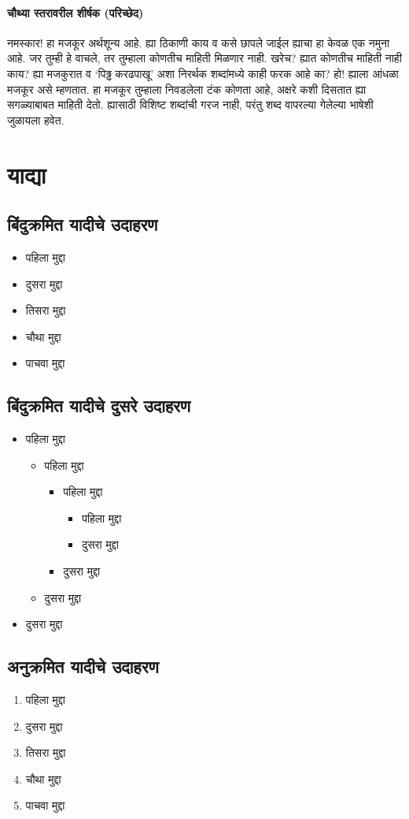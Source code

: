 \paragraph{चौथ्या स्तरावरील शीर्षक (परिच्छेद)}
नमस्कार! हा मजकूर अर्थशून्य आहे. ह्या ठिकाणी काय व कसे छापले जाईल ह्याचा हा केवळ एक नमुना आहे. जर तुम्ही हे वाचले, तर तुम्हाला कोणतीच माहिती मिळणार नाही. खरेच? ह्यात कोणतीच माहिती नाही काय? ह्या मजकुरात व `पिढ्ढ करढपाखू' अशा निरर्थक शब्दांमध्ये काही फरक आहे का? हो! ह्याला आंधळा मजकूर असे म्हणतात. हा मजकूर तुम्हाला निवडलेला टंक कोणता आहे, अक्षरे कशी दिसतात ह्या सगळ्याबाबत माहिती देतो. ह्यासाठी विशिष्ट शब्दांची गरज नाही, परंतु शब्द वापरल्या गेलेल्या भाषेशी जुळायला हवेत.
\section{याद्या}
\subsection{बिंदुक्रमित यादीचे उदाहरण}
\begin{itemize}
\item पहिला मुद्दा
\item दुसरा मुद्दा
\item तिसरा मुद्दा
\item चौथा मुद्दा
\item पाचवा मुद्दा
\end{itemize}
\subsection*{बिंदुक्रमित यादीचे दुसरे उदाहरण}
\begin{itemize}
\item पहिला मुद्दा
\begin{itemize}
\item पहिला मुद्दा
\begin{itemize}
\item पहिला मुद्दा
\begin{itemize}
\item पहिला मुद्दा
\item दुसरा मुद्दा
\end{itemize}
\item दुसरा मुद्दा
\end{itemize}
\item दुसरा मुद्दा
\end{itemize}
\item दुसरा मुद्दा
\end{itemize}
\subsection{अनुक्रमित यादीचे उदाहरण}
\begin{enumerate}
\item पहिला मुद्दा
\item दुसरा मुद्दा
\item तिसरा मुद्दा
\item चौथा मुद्दा
\item पाचवा मुद्दा
\end{enumerate}
